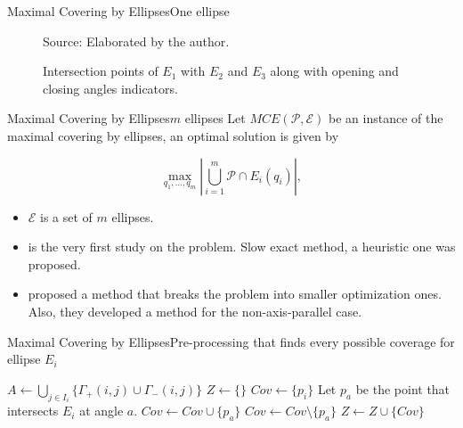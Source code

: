 \documentclass{beamer}
\newcommand{\Pp}{\mathscr{P}}
\newcommand{\E}{\mathscr{E}}
\newcommand{\source}[1]{\caption*{Source: {#1}} }
\begin{document}
\begin{frame}{Maximal Covering by Ellipses}{One ellipse}
\begin{figure}[H]
	\centering
	
	\caption{Intersection points of $E_1$ with $E_2$ and $E_3$ along with opening and closing angles indicators.}
	
	\source{Elaborated by the author.}
	\label{fig:3ellipses_with_gammas}
\end{figure}
\end{frame}


\begin{frame}{Maximal Covering by Ellipses}{$m$ ellipses}
	Let $MCE(\Pp, \E)$ be an instance of the maximal covering by ellipses, an optimal solution is given by
	
	\begin{equation*}
	\max_{q_1, \dots, q_m}{\left|\bigcup_{i=1}^{m} \Pp \cap E_i(q_i)\right|},
	\end{equation*}
	
	\begin{itemize}
		\item $\E$ is a set of $m$ ellipses.
		\item \autocite{canbolat} is the very first study on the problem. Slow exact method, a heuristic one was proposed.
		\item \autocite{andreta} proposed a method that breaks the problem into smaller optimization ones. Also, they developed a method for the non-axis-parallel case.
	\end{itemize}
\end{frame}

\begin{frame}[fragile]{Maximal Covering by Ellipses}{Pre-processing that finds every possible coverage for ellipse $E_i$}
	\begin{algorithm}[H]
		\begin{algorithmic}[1]
			\STATE $A \gets \bigcup_{j \in I_i} \{\Gamma_+(i,j) \cup \Gamma_-(i,j)\}$
			\STATE $Z \gets \{\}$
			\STATE $Cov \gets \{p_i\}$
			\STATE Let $p_a$ be the point that intersects $E_i$ at angle $a$. 
			\STATE $Cov \gets Cov \cup \{p_a\}$
			\ELSE
			\STATE $Cov \gets Cov \setminus \{p_a\}$
			\ENDIF
			\STATE $Z \gets Z \cup \{Cov\}$
			\ENDFOR
			\ENDFOR
			
		\end{algorithmic}
	\end{algorithm}
\end{frame}
\end{document}

